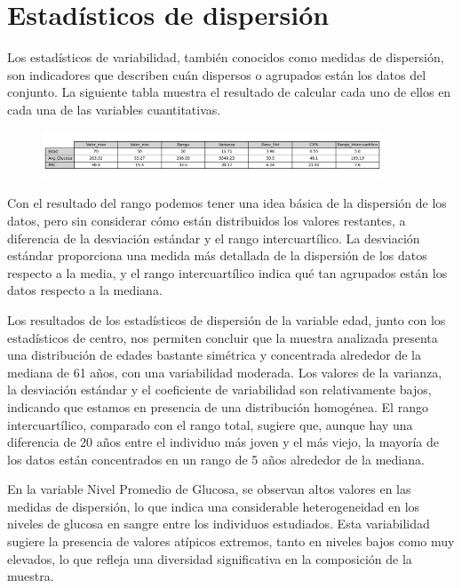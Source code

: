 \documentclass[a4paper, 12pt]{article}
\begin{document}
\newpage
\section{Estadísticos de dispersión}
Los estadísticos de variabilidad, también conocidos como medidas de dispersión, son
indicadores que describen cuán dispersos o agrupados están los datos del conjunto. La siguiente tabla muestra el resultado de calcular cada uno de ellos en cada una de
las variables cuantitativas.

\begin{figure}[h]
    \centering
    \includegraphics[width=0.9\textwidth]{img/Tablas/Estadísticos_de_dispersión.png}
\end{figure}

Con el resultado del rango podemos tener una idea básica de la dispersión de los datos, pero sin considerar cómo están 
distribuidos los valores restantes, a diferencia de la desviación estándar y el rango intercuartílico. La desviación estándar 
proporciona una medida más detallada de la dispersión de los datos respecto a la media, y el rango intercuartílico indica qué 
tan agrupados están los datos respecto a la mediana.

Los resultados de los estadísticos de dispersión de la variable edad, junto con los estadísticos de centro, nos permiten 
concluir que la muestra analizada presenta una distribución de edades bastante simétrica y concentrada alrededor de la mediana 
de 61 años, con una variabilidad moderada. Los valores de la varianza, la desviación estándar y el coeficiente de variabilidad 
son relativamente bajos, indicando que estamos en presencia de una distribución homogénea. El rango intercuartílico, comparado con el rango total, sugiere que, aunque hay una diferencia de 20 
años entre el individuo más joven y el más viejo, la mayoría de los datos están concentrados en un rango de 5 años alrededor 
de la mediana.

En la variable Nivel Promedio de Glucosa, se observan altos valores en las medidas de dispersión, lo que indica una considerable 
heterogeneidad en los niveles de glucosa en sangre entre los individuos estudiados. Esta variabilidad sugiere la presencia de 
valores atípicos extremos, tanto en niveles bajos como muy elevados, lo que refleja una diversidad significativa en la composición 
de la muestra.
\end{document}
